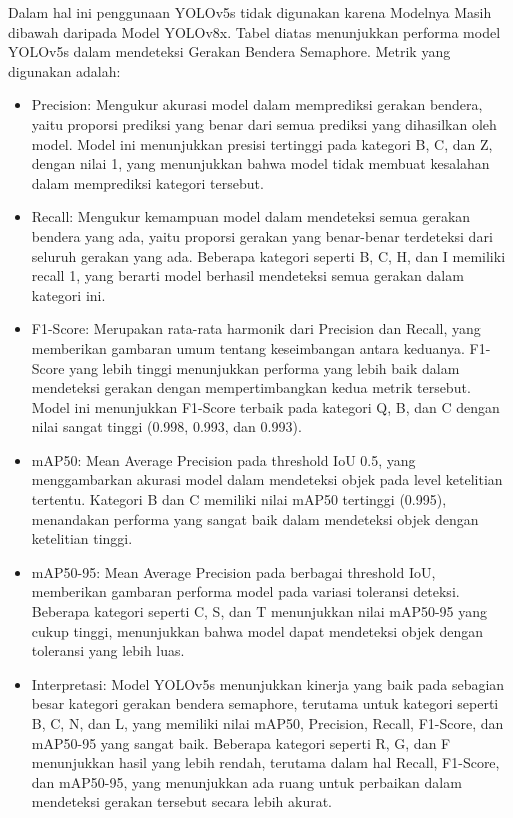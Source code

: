 \documentclass[12pt,a4paper]{article}
\begin{document}
\begin{adjustwidth}{3em}{0pt} 
Dalam hal ini penggunaan YOLOv5s tidak digunakan karena Modelnya Masih dibawah daripada Model YOLOv8x. Tabel diatas menunjukkan performa model YOLOv5s dalam mendeteksi Gerakan Bendera Semaphore. Metrik yang digunakan adalah:

\begin{itemize}
    \item Precision: Mengukur akurasi model dalam memprediksi gerakan bendera, yaitu proporsi prediksi yang benar dari semua prediksi yang dihasilkan oleh model. Model ini menunjukkan presisi tertinggi pada kategori B, C, dan Z, dengan nilai 1, yang menunjukkan bahwa model tidak membuat kesalahan dalam memprediksi kategori tersebut.
    
    \item Recall: Mengukur kemampuan model dalam mendeteksi semua gerakan bendera yang ada, yaitu proporsi gerakan yang benar-benar terdeteksi dari seluruh gerakan yang ada. Beberapa kategori seperti B, C, H, dan I memiliki recall 1, yang berarti model berhasil mendeteksi semua gerakan dalam kategori ini.
    
    \item F1-Score: Merupakan rata-rata harmonik dari Precision dan Recall, yang memberikan gambaran umum tentang keseimbangan antara keduanya. F1-Score yang lebih tinggi menunjukkan performa yang lebih baik dalam mendeteksi gerakan dengan mempertimbangkan kedua metrik tersebut. Model ini menunjukkan F1-Score terbaik pada kategori Q, B, dan C dengan nilai sangat tinggi (0.998, 0.993, dan 0.993).
    
    \item mAP50: Mean Average Precision pada threshold IoU 0.5, yang menggambarkan akurasi model dalam mendeteksi objek pada level ketelitian tertentu. Kategori B dan C memiliki nilai mAP50 tertinggi (0.995), menandakan performa yang sangat baik dalam mendeteksi objek dengan ketelitian tinggi.

    \item mAP50-95: Mean Average Precision pada berbagai threshold IoU, memberikan gambaran performa model pada variasi toleransi deteksi. Beberapa kategori seperti C, S, dan T menunjukkan nilai mAP50-95 yang cukup tinggi, menunjukkan bahwa model dapat mendeteksi objek dengan toleransi yang lebih luas.
    
    \item Interpretasi: Model YOLOv5s menunjukkan kinerja yang baik pada sebagian besar kategori gerakan bendera semaphore, terutama untuk kategori seperti B, C, N, dan L, yang memiliki nilai mAP50, Precision, Recall, F1-Score, dan mAP50-95 yang sangat baik. Beberapa kategori seperti R, G, dan F menunjukkan hasil yang lebih rendah, terutama dalam hal Recall, F1-Score, dan mAP50-95, yang menunjukkan ada ruang untuk perbaikan dalam mendeteksi gerakan tersebut secara lebih akurat.
    

\end{itemize}
\end{adjustwidth}
\end{document}
